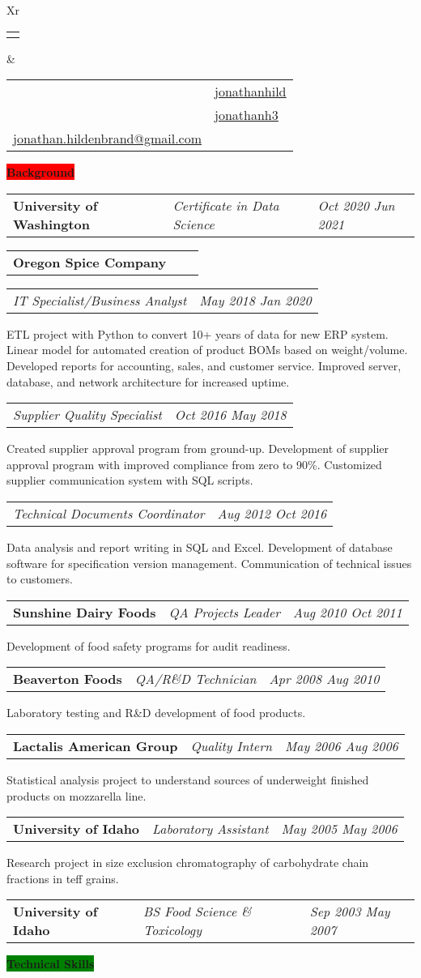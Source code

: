 \documentclass[letterpaper,12pt]{article}[leftmargin=*]
\makeatletter
\def\fullname{Jonathan Hildenbrand}
\def\githubicon{\faGithub}
\def\githublink{https://github.com/jonathanhild}
\def\githubtext{jonathanhild}
\def\linkedinicon{\faLinkedin}
\def\linkedinlink{https://linkedin.com/in/jonathanh3}
\def\linkedintext{jonathanh3}
\def\phoneicon{\faPhone}
\def\phonetext{+1-971-409-0695}
\def\emailicon{\faEnvelope}
\def\emaillink{mailto:jonathan.hildenbrand+resume@gmail.com}
\def\emailtext{jonathan.hildenbrand@gmail.com}
\def\locationicon{\faMapMarker}
\def\locationtext{Portland, Oregon}
\def\targeticon{\faBinoculars}
\def\targettext{Local \& Remote}
\def\headertype{\doublecol} %
\def\location{\hspace{3pt}\locationicon \hspace{5pt}{\color{links}\locationtext}}
\def\target{\targeticon\hspace{3pt}{\color{links}\targettext}}
\def\phone{\phoneicon\hspace{3pt}{\color{links}{\phonetext}}}
\def\linkedin{\linkedinicon\hspace{3pt}\href{\linkedinlink}{\underline{\linkedintext}}}
\def\email{\emailicon\hspace{3pt}\href{\emaillink}{\underline{\emailtext}}}
\def\github{\githubicon\hspace{3pt}\href{\githublink}{\underline{\githubtext}}}
\newcommand{\background}[2]{\vspace{4pt}
  \colorbox{Red}{\color{white}#1\hspace{9pt}\raggedbottom\normalsize\textbf{#2\hspace{4pt}}}
}
\newcommand{\skills}[2]{\vspace{4pt}
  \colorbox{Green}{\color{white}#1\hspace{9pt}\raggedbottom\normalsize\textbf{#2\hspace{4pt}}}
}
\newcommand{\resumeSectionStart}{\begin{itemize}[leftmargin=0.1in]}
\newcommand{\resumeSectionEnd}{\end{itemize}}
\newcommand{\resumeExperience}[3]{
  \item[]
    \begin{tabularx}{0.97\textwidth}{>{\raggedright}X >{\raggedright\arraybackslash}X >{\raggedleft\arraybackslash}X}
      \textbf{\faTable\color{primary}\hspace{10px}#1} & \textit{\color{accent}#2} & \textit{\color{accent}\small#3} \\
  \end{tabularx}
   \vspace{-6pt}
   
}
\newcommand{\resumeSubExperience}[2]{
  \begin{tabularx}{0.97\textwidth}{>{\raggedright\arraybackslash}X >{\raggedleft}X}
    \textit{\color{accent}#1} & \textit{\color{accent}\small#2}
  \end{tabularx}
}
\newcommand{\resumeEducation}[3]{
  \item[]
    \begin{tabularx}{0.97\textwidth}[t]{>{\raggedright}X >{\raggedright\arraybackslash}X >{\raggedleft\arraybackslash}X}
      \textbf{\faGraduationCap\color{primary}\hspace{6px}#1} & \textit{\color{accent}#2} & \textit{\color{accent}\small#3} \\
    \end{tabularx}
    \vspace{-6pt}
}
\newcommand{\doublecol}[6]{
  \begin{tabularx}{\textwidth}{Xr}
    {
      \begin{tabular}[c]{l}
        \fontsize{24}{34}\selectfont{\color{primary}{{\textbf{\fullname}}}}
      \end{tabular}
    } & {
      \begin{tabular}[c]{l@{\hspace{1.5em}} l}
        {\small#4} & {\small#1} \\
        {\small#5} & {\small#2} \\
        {\small#6} & {\small#3}
      \end{tabular}
    }
  \end{tabularx}
}
\newcommand{\singlecol}[6]{
  \begin{tabularx}{\textwidth}{Xr}
    {
      \begin{tabular}[b]{l}
        \fontsize{35}{45}\selectfont{\color{primary}{{\textbf{\fullname}}}} \\
        {\textit{\subtitle}} %
      \end{tabular}
    } & {
      \begin{tabular}[c]{l}
        {\small#1} \\
        {\small#2} \\
        {\small#3} \\
        {\small#4} \\
        {\small#5} \\
        {\small#6}
      \end{tabular}
    }
  \end{tabularx}
}
\makeatother
\begin{document}
\headertype{\github}{\linkedin}{\phone}{\location}{\target}{\email} %


\background{\faUser}{Background}
\resumeSectionStart{\resumeEducation{University of Washington}{Certificate in Data Science}{Oct 2020 \textemdash{} Jun 2021}}\resumeSectionEnd{}
\resumeSectionStart{\resumeExperience{Oregon Spice Company}{}{}
  \resumeSubExperience{IT Specialist/Business Analyst}{May 2018 \textemdash{} Jan 2020}ETL project with Python to convert 10+ years of data for new ERP system. Linear model for automated creation of product BOMs based on weight/volume. Developed reports for accounting, sales, and customer service. Improved server, database, and network architecture for increased uptime.
  \resumeSubExperience{Supplier Quality Specialist}{Oct 2016 \textemdash{} May 2018}Created supplier approval program from ground-up. Development of supplier approval program with improved compliance from zero to 90\%. Customized supplier communication system with SQL scripts.
  \resumeSubExperience{Technical Documents Coordinator}{Aug 2012 \textemdash{} Oct 2016}Data analysis and report writing in SQL and Excel. Development of database software for specification version management. Communication of technical issues to customers.}\resumeSectionEnd{}
\resumeSectionStart{\resumeExperience{Sunshine Dairy Foods}{QA Projects Leader}{Aug 2010 \textemdash{} Oct 2011}Development of food safety programs for audit readiness.}\resumeSectionEnd{}
\resumeSectionStart{\resumeExperience{Beaverton Foods}{QA/R\&D Technician}{Apr 2008 \textemdash{} Aug 2010}Laboratory testing and R\&D development of food products.}\resumeSectionEnd{}
\resumeSectionStart{\resumeExperience{Lactalis American Group}{Quality Intern}{May 2006 \textemdash{} Aug 2006}Statistical analysis project to understand sources of underweight finished products on mozzarella line.}\resumeSectionEnd{}
\resumeSectionStart{\resumeExperience{University of Idaho}{Laboratory Assistant}{May 2005 \textemdash{} May 2006}Research project in size exclusion chromatography of carbohydrate chain fractions in teff grains.}
\resumeEducation{University of Idaho}{BS Food Science \& Toxicology}{Sep 2003 \textemdash{} May 2007}
\resumeSectionEnd{}


\skills{\faGears}{Technical Skills}
\end{document}
